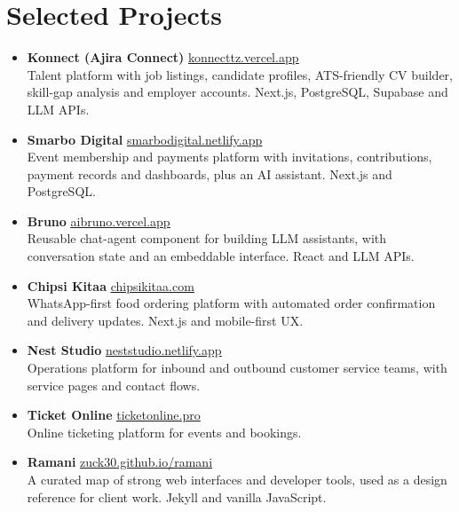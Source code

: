 \documentclass[12pt]{article}
\newcommand{\hlink}[2]{\href{#1}{\textcolor{linkblue}{\underline{#2}}}}
\begin{document}
\section*{Selected Projects}
\begin{itemize}
  \item \textbf{Konnect (Ajira Connect)} \hlink{https://konnecttz.vercel.app}{konnecttz.vercel.app}\\
  Talent platform with job listings, candidate profiles, ATS-friendly CV builder, skill-gap analysis and employer accounts. Next.js, PostgreSQL, Supabase and LLM APIs.

  \item \textbf{Smarbo Digital} \hlink{https://smarbodigital.netlify.app}{smarbodigital.netlify.app}\\
  Event membership and payments platform with invitations, contributions, payment records and dashboards, plus an AI assistant. Next.js and PostgreSQL.

  \item \textbf{Bruno} \hlink{https://aibruno.vercel.app}{aibruno.vercel.app}\\
  Reusable chat-agent component for building LLM assistants, with conversation state and an embeddable interface. React and LLM APIs.

  \item \textbf{Chipsi Kitaa} \hlink{https://chipsikitaa.com}{chipsikitaa.com}\\
  WhatsApp-first food ordering platform with automated order confirmation and delivery updates. Next.js and mobile-first UX.

  \item \textbf{Nest Studio} \hlink{https://neststudio.netlify.app}{neststudio.netlify.app}\\
  Operations platform for inbound and outbound customer service teams, with service pages and contact flows.

  \item \textbf{Ticket Online} \hlink{https://www.ticketonline.pro}{ticketonline.pro}\\
  Online ticketing platform for events and bookings.

  \item \textbf{Ramani} \hlink{https://zuck30.github.io/ramani/}{zuck30.github.io/ramani}\\
  A curated map of strong web interfaces and developer tools, used as a design reference for client work. Jekyll and vanilla JavaScript.
\end{itemize}
\end{document}
